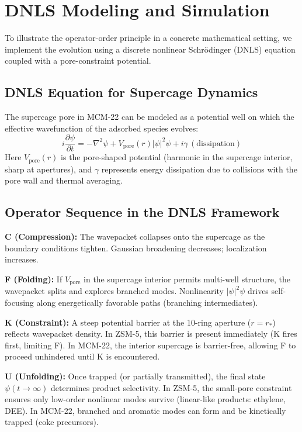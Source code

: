 \documentclass[11pt]{article}
\begin{document}
\section{DNLS Modeling and Simulation}

To illustrate the operator-order principle in a concrete mathematical setting, we implement the evolution using a discrete nonlinear Schr\"odinger (DNLS) equation coupled with a pore-constraint potential.

\subsection{DNLS Equation for Supercage Dynamics}

The supercage pore in MCM-22 can be modeled as a potential well on which the effective wavefunction of the adsorbed species evolves:
$$i\frac{\partial \psi}{\partial t} = -\nabla^2\psi + V_{\mathrm{pore}}(r)|\psi|^2\psi + i\gamma\,(\text{dissipation})$$
Here $V_{\mathrm{pore}}(r)$ is the pore-shaped potential (harmonic in the supercage interior, sharp at apertures), and $\gamma$ represents energy dissipation due to collisions with the pore wall and thermal averaging.

\subsection{Operator Sequence in the DNLS Framework}

\textbf{C (Compression):} The wavepacket collapses onto the supercage as the boundary conditions tighten. Gaussian broadening decreases; localization increases.

\textbf{F (Folding):} If $V_{\mathrm{pore}}$ in the supercage interior permits multi-well structure, the wavepacket splits and explores branched modes. Nonlinearity $|\psi|^2\psi$ drives self-focusing along energetically favorable paths (branching intermediates).

\textbf{K (Constraint):} A steep potential barrier at the 10-ring aperture ($r=r_*$) reflects wavepacket density. In ZSM-5, this barrier is present immediately (K fires first, limiting F). In MCM-22, the interior supercage is barrier-free, allowing F to proceed unhindered until K is encountered.

\textbf{U (Unfolding):} Once trapped (or partially transmitted), the final state $\psi(t\to\infty)$ determines product selectivity. In ZSM-5, the small-pore constraint ensures only low-order nonlinear modes survive (linear-like products: ethylene, DEE). In MCM-22, branched and aromatic modes can form and be kinetically trapped (coke precursors).
\end{document}
